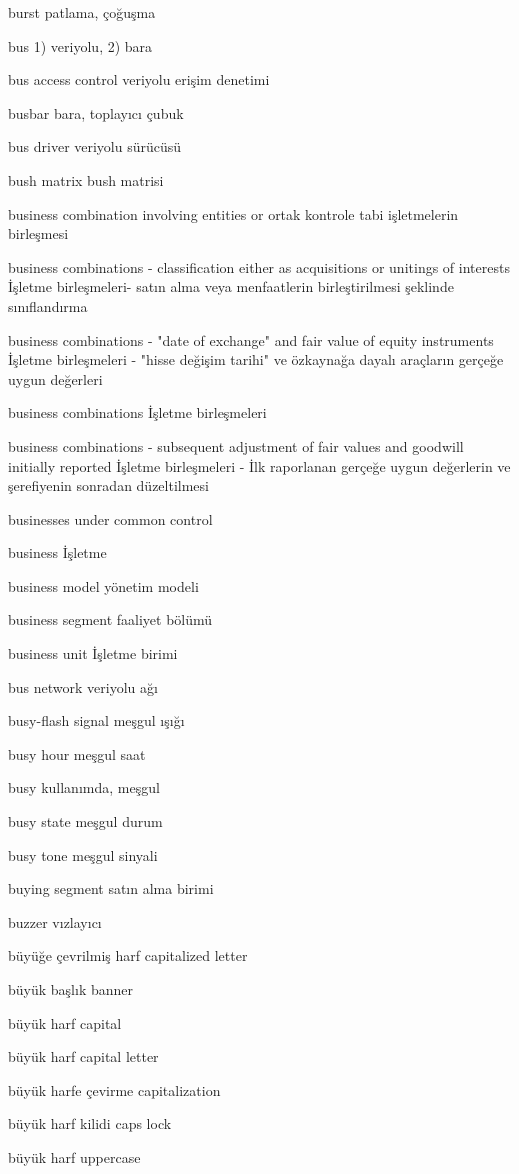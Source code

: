 \documentclass[12pt,fleqn]{article}\usepackage{../../common}
\begin{document}
burst patlama, çoğuşma

bus 1) veriyolu, 2) bara

bus access control veriyolu erişim denetimi

busbar bara, toplayıcı çubuk

bus driver veriyolu sürücüsü

bush matrix bush matrisi

business combination involving entities or ortak kontrole tabi işletmelerin birleşmesi

business combinations - classification either as acquisitions or unitings of interests İşletme birleşmeleri- satın alma veya menfaatlerin birleştirilmesi şeklinde sınıflandırma

business combinations - "date of exchange" and fair value of equity instruments İşletme birleşmeleri - "hisse değişim tarihi" ve özkaynağa dayalı araçların gerçeğe uygun değerleri

business combinations İşletme birleşmeleri

business combinations - subsequent adjustment of fair values and goodwill initially reported İşletme birleşmeleri - İlk raporlanan gerçeğe uygun değerlerin ve şerefiyenin sonradan düzeltilmesi

businesses under common control

business İşletme

business model yönetim modeli

business segment faaliyet bölümü

business unit İşletme birimi

bus network veriyolu ağı

busy-flash signal meşgul ışığı

busy hour meşgul saat

busy kullanımda, meşgul

busy state meşgul durum

busy tone meşgul sinyali

buying segment satın alma birimi

buzzer vızlayıcı

büyüğe çevrilmiş harf capitalized letter

büyük başlık banner

büyük harf capital

büyük harf capital letter

büyük harfe çevirme capitalization

büyük harf kilidi caps lock

büyük harf uppercase
\end{document}
